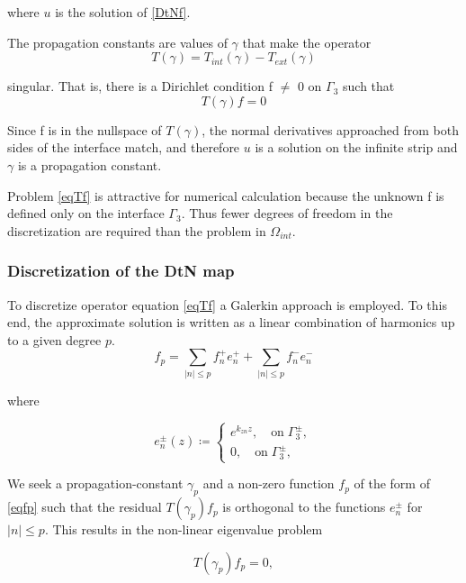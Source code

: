 where $u$ is the solution of \ref{DtNf}.

The propagation constants are values of $\gamma$ that make the operator
\begin{equation}
T(\gamma) = T_{int}(\gamma) - T_{ext}(\gamma)
\label{eqTdiff}
\end{equation} 

singular. That is, there is a Dirichlet condition f $\neq$ 0 on
$\Gamma_3$ such that
\begin{equation}
T(\gamma) f = 0
\label{eqTf}
\end{equation}

Since f is in the nullspace of $T(\gamma)$, the normal derivatives
approached from both sides of the interface match, and therefore $u$
is a solution on the infinite strip and $\gamma$ is a propagation
constant.

Problem \ref{eqTf} is attractive for numerical calculation because the
unknown f is defined only on the interface $\Gamma_3$. Thus fewer
degrees of freedom in the discretization are required than the problem
in $\Omega_{int}$.

\subsubsection{Discretization of the DtN map}
To discretize operator equation \ref{eqTf} a Galerkin approach is
employed. To this end, the approximate solution is written as a linear
combination of harmonics up to a given degree $p$.
\begin{equation}
f_p = \sum_{|n|\leq p} f_n^+ e_n^+ + \sum_{|n| \leq p} f_n^- e_n^-
\label{eqfp}
\end{equation} 

where

\begin{equation}
e_n^\pm (z)\coloneqq \left \{ \begin{array} {ll}
e^{k_{zn} z}, \quad \textrm{on} \; \Gamma_3^{\pm}, \\
0, \quad \textrm{on} \; \Gamma_3^\pm,
\end{array} \right .
\label{eqepm}
\end{equation} 

We seek a propagation-constant $\gamma_p$ and a non-zero function $f_p$ of
the form of \ref{eqfp} such that the residual $T(\gamma_p) f_p$ is
orthogonal to the functions $e_n^\pm$ for $|n| \leq p$. This
results in the non-linear eigenvalue problem

\begin{equation}
T(\gamma_p) f_p = 0,
\label{eqTpfp}
\end{equation} 

